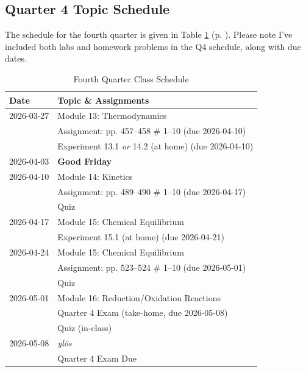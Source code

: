 \documentclass[11pt, oneside]{article}   	%
\begin{document}
\pagebreak
\subsection*{Quarter 4 Topic Schedule}
The schedule for the fourth quarter is given in Table \ref{table:class-schedule-q4} (p. \pageref{table:class-schedule-q4}).
Please note I've included both labs and homework problems in the Q4 schedule, along with due dates.

\begin{table}[h]
\centering
\begin{tabular}{ l | l }
Date & Topic \& Assignments \\
\hline
2026-03-27 & Module 13:  Thermodynamics \\
		  & Assignment: pp. 457--458 \# 1--10 (due 2026-04-10) \\
		  & Experiment 13.1 \emph{or} 14.2 (at home) (due 2026-04-10) \\

\hline
2026-04-03 & \textbf{Good Friday} \\
                   
\hline
2026-04-10 & Module 14: Kinetics \\
                   & Assignment: pp. 489--490 \# 1--10 (due 2026-04-17) \\
                   & Quiz \\

\hline
2026-04-17 & Module 15: Chemical Equilibrium \\
                   & Experiment 15.1 (at home) (due 2026-04-21)\\

\hline
2026-04-24 & Module 15: Chemical Equilibrium \\
		  & Assignment: pp. 523--524 \# 1--10 (due 2026-05-01)\\
                   & Quiz \\

\hline
2026-05-01 & Module 16: Reduction/Oxidation Reactions \\
                   & Quarter 4 Exam (take-home, due 2026-05-08) \\
                   & Quiz (in-class) \\

\hline
2026-05-08 & \emph{yl\"os} \\
                   & Quarter 4 Exam Due\\
                   
\end{tabular}
\caption{Fourth Quarter Class Schedule}\label{table:class-schedule-q4}
\end{table}
\end{document}
